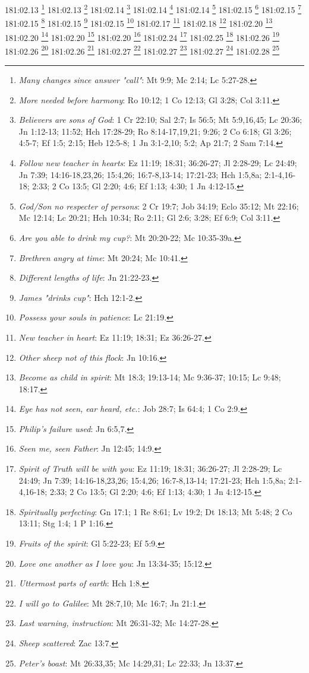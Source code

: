 181:02.13 \footnote{\textit{Many changes since answer "call"}: Mt 9:9; Mc 2:14; Lc 5:27-28.}
181:02.13 \footnote{\textit{More needed before harmony}: Ro 10:12; 1 Co 12:13; Gl 3:28; Col 3:11.}
181:02.14 \footnote{\textit{Believers are sons of God}: 1 Cr 22:10; Sal 2:7; Is 56:5; Mt 5:9,16,45; Lc 20:36; Jn 1:12-13; 11:52; Hch 17:28-29; Ro 8:14-17,19,21; 9:26; 2 Co 6:18; Gl 3:26; 4:5-7; Ef 1:5; 2:15; Heb 12:5-8; 1 Jn 3:1-2,10; 5:2; Ap 21:7; 2 Sam 7:14.}
181:02.14 \footnote{\textit{Follow new teacher in hearts}: Ez 11:19; 18:31; 36:26-27; Jl 2:28-29; Lc 24:49; Jn 7:39; 14:16-18,23,26; 15:4,26; 16:7-8,13-14; 17:21-23; Hch 1:5,8a; 2:1-4,16-18; 2:33; 2 Co 13:5; Gl 2:20; 4:6; Ef 1:13; 4:30; 1 Jn 4:12-15.}
181:02.14 \footnote{\textit{God/Son no respecter of persons}: 2 Cr 19:7; Job 34:19; Eclo 35:12; Mt 22:16; Mc 12:14; Lc 20:21; Hch 10:34; Ro 2:11; Gl 2:6; 3:28; Ef 6:9; Col 3:11.}
181:02.15 \footnote{\textit{Are you able to drink my cup?}: Mt 20:20-22; Mc 10:35-39a.}
181:02.15 \footnote{\textit{Brethren angry at time}: Mt 20:24; Mc 10:41.}
181:02.15 \footnote{\textit{Different lengths of life}: Jn 21:22-23.}
181:02.15 \footnote{\textit{James "drinks cup"}: Hch 12:1-2.}
181:02.15 \footnote{\textit{Possess your souls in patience}: Lc 21:19.}
181:02.17 \footnote{\textit{New teacher in heart}: Ez 11:19; 18:31; Ez 36:26-27.}
181:02.18 \footnote{\textit{Other sheep not of this flock}: Jn 10:16.}
181:02.20 \footnote{\textit{Become as child in spirit}: Mt 18:3; 19:13-14; Mc 9:36-37; 10:15; Lc 9:48; 18:17.}
181:02.20 \footnote{\textit{Eye has not seen, ear heard, etc.}: Job 28:7; Is 64:4; 1 Co 2:9.}
181:02.20 \footnote{\textit{Philip's failure used}: Jn 6:5,7.}
181:02.20 \footnote{\textit{Seen me, seen Father}: Jn 12:45; 14:9.}
181:02.24 \footnote{\textit{Spirit of Truth will be with you}: Ez 11:19; 18:31; 36:26-27; Jl 2:28-29; Lc 24:49; Jn 7:39; 14:16-18,23,26; 15:4,26; 16:7-8,13-14; 17:21-23; Hch 1:5,8a; 2:1-4,16-18; 2:33; 2 Co 13:5; Gl 2:20; 4:6; Ef 1:13; 4:30; 1 Jn 4:12-15.}
181:02.25 \footnote{\textit{Spiritually perfecting}: Gn 17:1; 1 Re 8:61; Lv 19:2; Dt 18:13; Mt 5:48; 2 Co 13:11; Stg 1:4; 1 P 1:16.}
181:02.26 \footnote{\textit{Fruits of the spirit}: Gl 5:22-23; Ef 5:9.}
181:02.26 \footnote{\textit{Love one another as I love you}: Jn 13:34-35; 15:12.}
181:02.26 \footnote{\textit{Uttermost parts of earth}: Hch 1:8.}
181:02.27 \footnote{\textit{I will go to Galilee}: Mt 28:7,10; Mc 16:7; Jn 21:1.}
181:02.27 \footnote{\textit{Last warning, instruction}: Mt 26:31-32; Mc 14:27-28.}
181:02.27 \footnote{\textit{Sheep scattered}: Zac 13:7.}
181:02.28 \footnote{\textit{Peter's boast}: Mt 26:33,35; Mc 14:29,31; Lc 22:33; Jn 13:37.}
